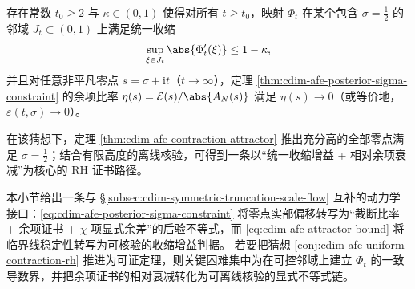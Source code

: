 \begin{conjecture}[统一收缩增益与黎曼猜想的动力学等价]\label{conj:cdim-afe-uniform-contraction-rh}
存在常数 \(t_0\ge 2\) 与 \(\kappa\in(0,1)\) 使得对所有 \(t\ge t_0\)，映射 \(\Phi_t\) 在某个包含 \(\sigma=\tfrac12\) 的邻域 \(J_t\subset(0,1)\) 上满足统一收缩
\[
\sup_{\xi\in J_t}\abs{\Phi_t'(\xi)}\le 1-\kappa,
\]
并且对任意非平凡零点 \(s=\sigma+\mathrm{i}t\)（\(t\to\infty\)），定理 \ref{thm:cdim-afe-posterior-sigma-constraint} 的余项比率 \(\eta(s)=\mathcal{E}(s)/\abs{A_N(s)}\) 满足 \(\eta(s)\to 0\)（或等价地，\(\varepsilon(t,\sigma)\to 0\)）。
\par
在该猜想下，定理 \ref{thm:cdim-afe-contraction-attractor} 推出充分高的全部零点满足 \(\sigma=\tfrac12\)；结合有限高度的离线核验，可得到一条以“统一收缩增益 + 相对余项衰减”为核心的 RH 证书路径。
\end{conjecture}

本小节给出一条与 \S\ref{subsec:cdim-symmetric-truncation-scale-flow} 互补的动力学接口：\eqref{eq:cdim-afe-posterior-sigma-constraint} 将零点实部偏移转写为“截断比率 + 余项证书 + \(\chi\)-项显式余差”的后验不等式，而 \eqref{eq:cdim-afe-attractor-bound} 将临界线稳定性转写为可核验的收缩增益判据。
若要把猜想 \ref{conj:cdim-afe-uniform-contraction-rh} 推进为可证定理，则关键困难集中为在可控邻域上建立 \(\Phi_t\) 的一致导数界，并把余项证书的相对衰减转化为可离线核验的显式不等式链。

\endinput

